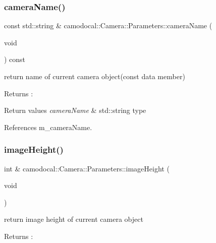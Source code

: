 \subsubsection{\texorpdfstring{camera\+Name()}{cameraName()}\hspace{0.1cm}{\footnotesize\ttfamily [2/2]}}
{\footnotesize\ttfamily const std\+::string \& camodocal\+::\+Camera\+::\+Parameters\+::camera\+Name (\begin{DoxyParamCaption}\item[{void}]{ }\end{DoxyParamCaption}) const}



return name of current camera object(const data member) 

\begin{DoxyReturn}{Returns}
\+: 
\end{DoxyReturn}

\begin{DoxyRetVals}{Return values}
{\em camera\+Name} & std\+::string type \\
\hline
\end{DoxyRetVals}


References m\+\_\+camera\+Name.

\mbox{\label{classcamodocal_1_1Camera_1_1Parameters_a2dcff4a5472ebc79d5d72762681220a3}} 
\subsubsection{\texorpdfstring{image\+Height()}{imageHeight()}\hspace{0.1cm}{\footnotesize\ttfamily [1/2]}}
{\footnotesize\ttfamily int \& camodocal\+::\+Camera\+::\+Parameters\+::image\+Height (\begin{DoxyParamCaption}\item[{void}]{ }\end{DoxyParamCaption})}



return image height of current camera object 

\begin{DoxyReturn}{Returns}
\+: 
\end{DoxyReturn}

